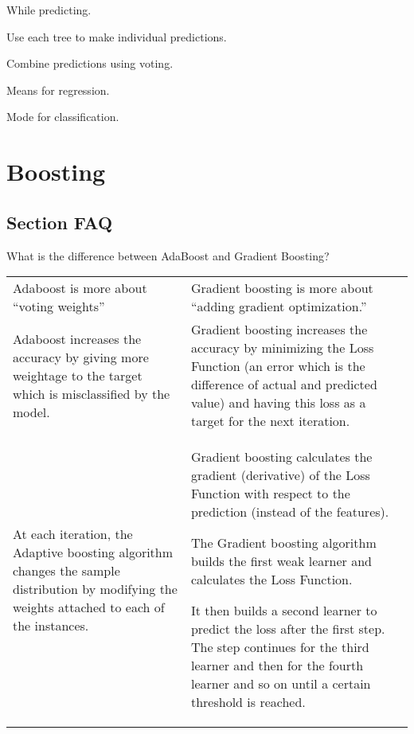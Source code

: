 While predicting.
	\begin{bulletedlist}
		\item Use each tree to make individual predictions.
		\item Combine predictions using voting.
		\begin{bulletedlist}
			\item Means for regression.
			\item Mode for classification.
		\end{bulletedlist}
	\end{bulletedlist}


	\section{Boosting}
	\subsection{Section FAQ}
	\resetquestioncounter{}
    \begin{qanda}
		\begin{question}
What is the difference between AdaBoost and Gradient Boosting?
		\end{question}

		\begin{answer}
			\begin{tabular}{|p{0.5\qandatextwidth-2\tabcolsep}|p{0.5\qandatextwidth-2\tabcolsep}|} \hline
					\tablecolumnheadervlinesone{AdaBoost} & \tablecolumnheadervlinestwo{Gradient Boosting} \\ \hline
					Adaboost is more about ``voting weights'' &
		            Gradient boosting is more about ``adding gradient optimization.'' \\ \hline
					Adaboost increases the accuracy by giving more weightage to the target which is misclassified by the model.	&
					Gradient boosting increases the accuracy by minimizing the Loss Function (an error which is the difference of actual and predicted value) and having this loss as a target for the next iteration. \\ \hline
					At each iteration, the Adaptive boosting algorithm changes the sample distribution by modifying the weights attached to each of the instances. &
					Gradient boosting calculates the gradient (derivative) of the Loss Function with respect to the prediction (instead of the features). \newline
		
		The Gradient boosting algorithm builds the first weak learner and calculates the Loss Function. \newline
		
		It then builds a second learner to predict the loss after the first step. The step continues for the third learner and then for the fourth learner and so on until a certain threshold is reached. \\ \hline%
				\end{tabular}
		\end{answer}
   \end{qanda}

